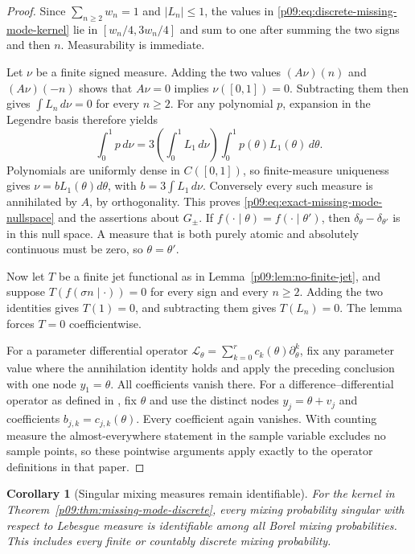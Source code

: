\documentclass[11pt,letterpaper]{article}
\newtheorem{corollary}[theorem]{Corollary}
\theoremstyle{definition}
\theoremstyle{remark}
\newcommand{\1}{\mathbf 1}
\begin{document}
\begin{proof}
Since $\sum_{n\ge2}w_n=1$ and $|L_n|\le1$, the values in
\eqref{p09:eq:discrete-missing-mode-kernel} lie in
$[w_n/4,3w_n/4]$ and sum to one after summing the two signs and then $n$.
Measurability is immediate.

Let $\nu$ be a finite signed measure.  Adding the two values
$(A\nu)(n)$ and $(A\nu)(-n)$ shows that $A\nu=0$ implies
$\nu([0,1])=0$.  Subtracting them then gives
$\int L_n\,d\nu=0$ for every $n\ge2$.
For any polynomial $p$, expansion in the Legendre basis therefore yields
\[
 \int_0^1p\,d\nu
 =3\left(\int_0^1L_1\,d\nu\right)
       \int_0^1p(\theta)L_1(\theta)\,d\theta.
\]
Polynomials are uniformly dense in $C([0,1])$, so finite-measure
uniqueness gives
$\nu=bL_1(\theta)d\theta$, with
$b=3\int L_1\,d\nu$.  Conversely every such measure is annihilated by
$A$, by orthogonality.  This proves
\eqref{p09:eq:exact-missing-mode-nullspace} and the assertions about
$G_\pm$.  If $f(\cdot\mid\theta)=f(\cdot\mid\theta')$, then
$\delta_\theta-\delta_{\theta'}$ is in this null space.  A measure that
is both purely atomic and absolutely continuous must be zero, so
$\theta=\theta'$.

Now let $T$ be a finite jet functional as in
Lemma~\ref{p09:lem:no-finite-jet}, and suppose
$T(f(\sigma n\mid\cdot))=0$ for every sign and every $n\ge2$.
Adding the two identities gives $T(1)=0$, and subtracting them gives
$T(L_n)=0$.  The lemma forces $T=0$ coefficientwise.

For a parameter differential operator
$\mathcal L_\theta=\sum_{k=0}^r c_k(\theta)\partial_\theta^k$,
fix any parameter value where the annihilation identity holds and apply
the preceding conclusion with one node $y_1=\theta$.  All coefficients
vanish there.  For a difference--differential operator as defined in
\cite[Definition~4]{LeBarilettoRinaldoHo2026}, fix $\theta$ and use the
distinct nodes $y_j=\theta+v_j$ and coefficients $b_{j,k}=c_{j,k}(\theta)$.
Every coefficient again vanishes.  With counting measure the
almost-everywhere statement in the sample variable excludes no sample
points, so these pointwise arguments apply exactly to the operator
definitions in that paper.
\end{proof}

\begin{corollary}[Singular mixing measures remain identifiable]
\label{p09:cor:singular-identification}
For the kernel in Theorem~\ref{p09:thm:missing-mode-discrete}, every mixing
probability singular with respect to Lebesgue measure is identifiable
among all Borel mixing probabilities.  This includes every finite or
countably discrete mixing probability.
\end{corollary}
\end{document}
